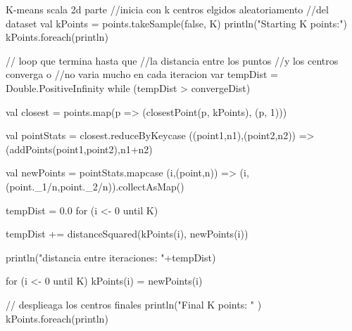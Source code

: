 \documentclass[a4paper]{article}
\begin{document}
\begin{sexylisting}{K-means scala 2d parte}
//inicia con k centros elgidos aleatoriamento 
//del dataset
val kPoints = points.takeSample(false, K)
println("Starting K points:")
kPoints.foreach(println) 

// loop que termina hasta que 
//la distancia entre los puntos 
//y los centros converga o 
//no varia mucho en cada iteracion
var tempDist = Double.PositiveInfinity
while (tempDist > convergeDist) {


    val closest = 
    points.map(p => (closestPoint(p, kPoints), (p, 1)))

    val pointStats = 
    closest.reduceByKey{case ((point1,n1),(point2,n2)) 
    => (addPoints(point1,point2),n1+n2) }

    val newPoints = 
    pointStats.map{case (i,(point,n))
    => (i,(point._1/n,point._2/n))}.collectAsMap()
    

    tempDist = 0.0
    for (i <- 0 until K) {
      
      tempDist += distanceSquared(kPoints(i),
      newPoints(i))
    }
    println("distancia entre iteraciones: "+tempDist)

    for (i <- 0 until K) {
      kPoints(i) = newPoints(i)
    }
}
   
// desplieaga los centros finales       
println("Final K points: " )
kPoints.foreach(println)
\end{sexylisting}
\end{document}

